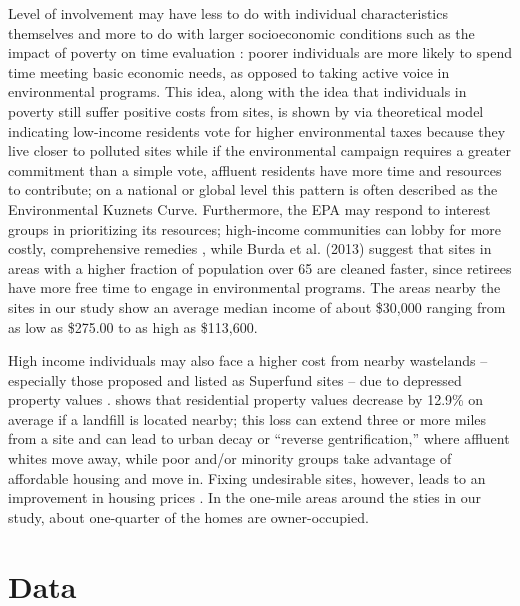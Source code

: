 \documentclass[12pt]{article}
\begin{document}
Level of involvement may have less to do with individual characteristics themselves and more to do with larger socioeconomic conditions such as the impact of poverty on time evaluation \parencite{dunlap1978new, Sigman2001}: poorer individuals are more likely to spend time meeting basic economic needs, as opposed to taking active voice in environmental programs. This idea, along with the idea that individuals in poverty still suffer positive costs from sites, is shown by \textcite{nakada_2017} via theoretical model indicating low-income residents vote for higher environmental taxes because they live closer to polluted sites while if the environmental campaign requires a greater commitment than a simple vote, affluent residents have more time and resources to contribute; on a national or global level this pattern is often described as the Environmental Kuznets Curve. Furthermore, the EPA may respond to interest groups in prioritizing its resources; high-income communities can lobby for more costly, comprehensive remedies \parencite{Sigman2001, Gamper-Rabindran2013, burda2014environmental}, while {Burda et al. (2013) suggest that sites in areas with a higher fraction of population over 65 are cleaned faster, since retirees have more free time to engage in environmental programs.} The areas nearby the sites in our study show an average median income of about \$30,000 ranging from as low as \$275.00 to as high as \$113,600. 

High income individuals may also face a higher cost from nearby wastelands -- especially those proposed and listed as Superfund sites -- due to depressed property values \parencite{McClelland1990}. \textcite{ready2010landfills} shows that residential property values decrease by 12.9\% on average if a landfill is located nearby; this loss can extend three or more miles from a site and can lead to urban decay or ``reverse gentrification,'' where affluent whites move away, while poor and/or minority groups take advantage of affordable housing and move in. Fixing undesirable sites, however, leads to an improvement in housing prices \parencite{Haninger2017}. In the one-mile areas around the sties in our study, about one-quarter of the homes are owner-occupied.

\section{Data}\label{data}

\end{document}
